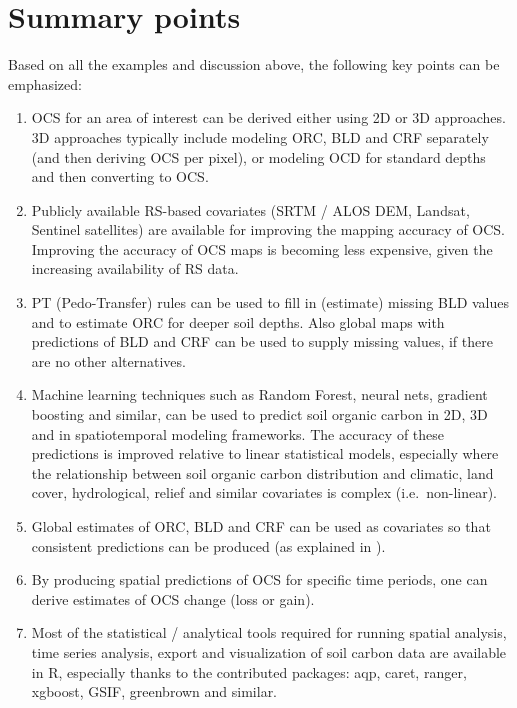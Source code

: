 \documentclass[graybox,natbib,nospthms,UStrade]{svmono}
\providecommand{\tightlist}{%
  \setlength{\itemsep}{0pt}\setlength{\parskip}{0pt}}
\providecommand{\tightlist}{\setlength{\itemsep}{0pt}\setlength{\parskip}{0pt}}
\begin{document}
\hypertarget{summary-points-4}{%
\section{Summary points}\label{summary-points-4}}

Based on all the examples and discussion above, the following key points can be emphasized:

\begin{enumerate}
\def\labelenumi{\arabic{enumi}.}
\tightlist
\item
  OCS for an area of interest can be derived either using 2D or 3D approaches. 3D approaches typically include modeling ORC, BLD and CRF separately (and then deriving OCS per pixel), or modeling OCD for standard depths and then converting to OCS.
\item
  Publicly available RS-based covariates (SRTM / ALOS DEM, Landsat, Sentinel satellites) are available for improving the mapping accuracy of OCS. Improving the accuracy of OCS maps is becoming less expensive, given the increasing availability of RS data.
\item
  PT (Pedo-Transfer) rules can be used to fill in (estimate) missing BLD values and to estimate ORC for deeper soil depths. Also global maps with predictions of BLD and CRF can be used to supply missing values, if there are no other alternatives.
\item
  Machine learning techniques such as Random Forest, neural nets, gradient boosting and similar, can be used to predict soil organic carbon in 2D, 3D and in spatiotemporal modeling frameworks. The accuracy of these predictions is improved relative to linear statistical models, especially where the relationship between soil organic carbon distribution and climatic, land cover, hydrological, relief and similar covariates is complex (i.e.~non-linear).
\item
  Global estimates of ORC, BLD and CRF can be used as covariates so that consistent predictions can be produced (as explained in \citet{ramcharan2018soil}).
\item
  By producing spatial predictions of OCS for specific time periods, one can derive estimates of OCS change (loss or gain).
\item
  Most of the statistical / analytical tools required for running spatial analysis, time series analysis, export and visualization of soil carbon data are available in R, especially thanks to the contributed packages: aqp, caret, ranger, xgboost, GSIF, greenbrown and similar.
\end{enumerate}
\end{document}
